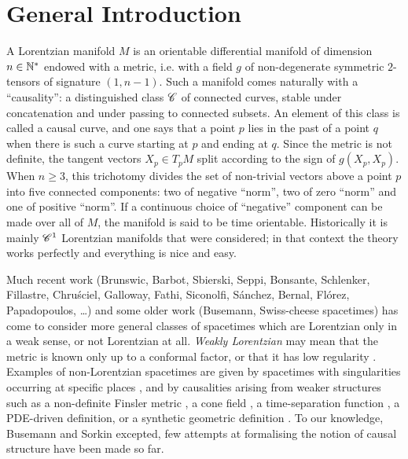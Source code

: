 \documentclass[a4paper,twoside]{article}
\begin{document}
\newpage

\setlength{\voffset}{-.50in}
\tableofcontents

\section{General Introduction}

A Lorentzian manifold $M$ is an orientable differential manifold of dimension
$n\in \mathbb{N}^*$ endowed with a metric, i.e. with a field $g$ of non-degenerate symmetric
$2$-tensors of signature $(1,n-1)$. Such a manifold comes naturally with a
``causality'': a distinguished class $\mathscr C$ of connected curves, stable under
concatenation and under passing to connected subsets. An element of this class is
called a causal curve, and one says that a point $p$ lies in the past of a point $q$
when there is such a curve starting at $p$ and ending at $q$. Since the metric is not
definite, the tangent vectors $X_p\in T_pM$ split according to the sign of
$g(X_p,X_p)$. When $n\geq 3$, this trichotomy divides the set of non-trivial vectors
above a point $p$ into five connected components: two of negative ``norm'', two of
zero ``norm'' and one of positive ``norm''. If a continuous choice of ``negative''
component can be made over all of $M$, the manifold is said to be time orientable.
Historically it is mainly $\mathscr C^1$ Lorentzian manifolds that were considered; in that
context the theory works perfectly and everything is nice and easy.

Much recent work (Brunswic, Barbot, Sbierski, Seppi, Bonsante, Schlenker, Fillastre,
Chru\'sciel, Galloway, Fathi, Siconolfi, S\'anchez, Bernal, Fl\'orez, Papadopoulos,
\dots) and some older work (Busemann, Swiss-cheese spacetimes) has come to consider
more general classes of spacetimes which are Lorentzian only in a weak sense, or not
Lorentzian at all. \emph{Weakly Lorentzian} may mean that the metric is known only up
to a conformal factor, or that it has low regularity
\cite{MR2949547,MR3500220,MR4047145,lefloch2010global}. Examples of non-Lorentzian
spacetimes are given by spacetimes with singularities occurring at specific places
\cite{carlip_1998,0264-9381-10-5-019,tHooft1988,seppiH2,Particules_2,Particules_1,brunswic:hal-01317447,thesis,GXramcover},
and by causalities arising from weaker structures such as a non-definite Finsler
metric \cite{MR4009771}, a cone field \cite{MR2887877,MR3783554,MR3955368}, a
time-separation function \cite{papadopoulos:hal-01276762}, a PDE-driven definition, or
a synthetic geometric definition \cite{MR3916126}. To our knowledge, Busemann and
Sorkin excepted, few attempts at formalising the notion of causal structure have been
made so far.
\end{document}
